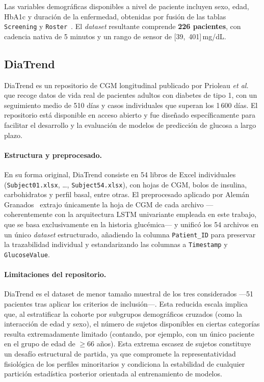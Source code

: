 Las variables demográficas disponibles a nivel de paciente incluyen sexo, edad, HbA1c y duración de la enfermedad, obtenidas por fusión de las tablas \texttt{Screening} y \texttt{Roster}~\cite{antoniotfg}. El \textit{dataset} resultante comprende \textbf{226 pacientes}, con cadencia nativa de 5 minutos y un rango de sensor de [39,~401]\,mg/dL.

\subsection{DiaTrend}
\label{subsec:dataset_diatrend}
DiaTrend es un repositorio de CGM longitudinal publicado por Prioleau \textit{et al.}~\cite{sun2023} que recoge datos de vida real de pacientes adultos con diabetes de tipo 1, con un seguimiento medio de 510 días y casos individuales que superan los 1\,600 días. El repositorio está disponible en acceso abierto y fue diseñado específicamente para facilitar el desarrollo y la evaluación de modelos de predicción de glucosa a largo plazo.

\paragraph{Estructura y preprocesado.} En su forma original, DiaTrend consiste en 54 libros de Excel individuales (\texttt{Subject01.xlsx}, \ldots, \texttt{Subject54.xlsx}), con hojas de CGM, bolos de insulina, carbohidratos y perfil basal, entre otras. El preprocesado aplicado por Alemán Granados~\cite{antoniotfg} extrajo únicamente la hoja de CGM de cada archivo ---coherentemente con la arquitectura LSTM univariante empleada en este trabajo, que se basa exclusivamente en la historia glucémica--- y unificó los 54 archivos en un único \textit{dataset} estructurado, añadiendo la columna \texttt{Patient\_ID} para preservar la trazabilidad individual y estandarizando las columnas a \texttt{Timestamp} y \texttt{GlucoseValue}.

\paragraph{Limitaciones del repositorio.} DiaTrend es el dataset de menor tamaño muestral de los tres considerados —51 pacientes tras aplicar los criterios de inclusión—. Esta reducida escala implica que, al estratificar la cohorte por subgrupos demográficos cruzados (como la interacción de edad y sexo), el número de sujetos disponibles en ciertas categorías resulta extremadamente limitado (contando, por ejemplo, con un único paciente en el grupo de edad de $\ge$66 años). Esta extrema escasez de sujetos constituye un desafío estructural de partida, ya que compromete la representatividad fisiológica de los perfiles minoritarios y condiciona la estabilidad de cualquier partición estadística posterior orientada al entrenamiento de modelos.

